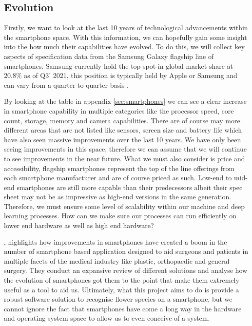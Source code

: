 \documentclass[12pt,a4paper]{report}
\begin{document}
\break

\subsection{Evolution}

Firstly, we want to look at the last 10 years of technological advancements within the smartphone space. 
With this information, we can hopefully gain some insight into the how much their capabilities have evolved. To do this, 
we will collect key aspects of specification data from the Samsung Galaxy flagship line of smartphones. Samsung 
currently hold the top spot in global market share at 20.8\% as of Q3' 2021, this position is typically held by Apple or
Samsung and can vary from a quarter to quarter basis \citep{odea2021}.

\par

By looking at the table in appendix \ref{sec:smartphones} we can see a clear increase in smartphone capability in 
multiple categories like the processor speed, core count, 
storage, memory and camera capabilities. There are of course may more different areas that are not listed like sensors, 
screen size and battery life which have also seen massive improvements over the last 10 years. We have only been seeing 
improvements in this space, therefore we can assume that we will continue to see improvements in the near future. 
What we must also consider is price and accessibility, flagship smartphones represent the top of the line offerings from
each smartphone manufacturer and are of course priced as such. Low-end to mid-end smartphones are still more capable 
than their predecessors albeit their spec sheet may not be as impressive as high-end versions in the same generation. 
Therefore, we must ensure some level of scalability within our machine and deep learning processes. How can we make 
sure our processes can run efficiently on lower end hardware as well as high end hardware?

\par

\citet{kulendran2014}, highlights how improvements in smartphones have created a boom in the number of 
smartphone based application designed to aid surgeons and patients in multiple facets of the medical industry like 
plastic, orthopaedic and general surgery. They conduct an expansive review of different solutions and analyse how the 
evolution of smartphones got them to the point that make them extremely useful as a tool to aid us. Ultimately, what 
this project aims to do is provide a robust software solution to recognise flower species on a smartphone, but we 
cannot ignore the fact that smartphones have come a long way in the hardware and operating system space to allow us to 
even conceive of a system.
\end{document}
